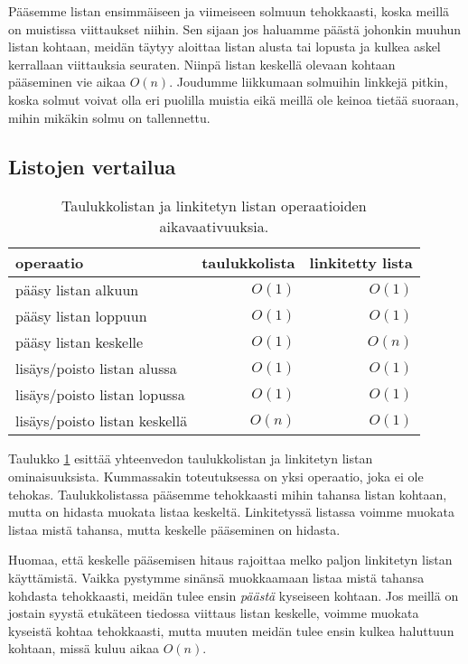 Pääsemme listan ensimmäiseen ja viimeiseen solmuun tehokkaasti,
koska meillä on muistissa viittaukset niihin.
Sen sijaan jos haluamme päästä johonkin muuhun listan kohtaan,
meidän täytyy aloittaa listan alusta tai lopusta ja kulkea askel
kerrallaan viittauksia seuraten.
Niinpä listan keskellä olevaan kohtaan pääseminen vie aikaa $O(n)$.
Joudumme liikkumaan solmuihin linkkejä pitkin, koska solmut voivat
olla eri puolilla muistia eikä meillä ole keinoa tietää suoraan,
mihin mikäkin solmu on tallennettu.

\subsection{Listojen vertailua}

\begin{table}
\center
\begin{tabular}{lrr}
operaatio & taulukkolista & linkitetty lista \\
\hline
pääsy listan alkuun & $O(1)$ & $O(1)$ \\
pääsy listan loppuun & $O(1)$ & $O(1)$ \\ 
pääsy listan keskelle &  $O(1)$ & $O(n)$ \\
lisäys/poisto listan alussa & $O(1)$ & $O(1)$ \\
lisäys/poisto listan lopussa & $O(1)$ & $O(1)$ \\ 
lisäys/poisto listan keskellä &  $O(n)$ & $O(1)$ \\
\end{tabular}
\caption{Taulukkolistan ja linkitetyn listan operaatioiden
aikavaativuuksia.}
\label{tab:taulin}
\end{table}

Taulukko \ref{tab:taulin} esittää yhteenvedon taulukkolistan ja
linkitetyn listan ominaisuuksista.
Kummassakin toteutuksessa on yksi operaatio,
joka ei ole tehokas.
Taulukkolistassa pääsemme tehokkaasti mihin tahansa listan
kohtaan, mutta on hidasta muokata listaa keskeltä.
Linkitetyssä listassa voimme muokata listaa mistä tahansa,
mutta keskelle pääseminen on hidasta.

Huomaa, että keskelle pääsemisen hitaus rajoittaa melko paljon
linkitetyn listan käyttämistä.
Vaikka pystymme sinänsä muokkaamaan listaa mistä tahansa kohdasta
tehokkaasti, meidän tulee ensin \emph{päästä} kyseiseen kohtaan.
Jos meillä on jostain syystä etukäteen tiedossa viittaus listan keskelle,
voimme muokata kyseistä kohtaa tehokkaasti,
mutta muuten meidän tulee ensin kulkea haluttuun kohtaan,
missä kuluu aikaa $O(n)$.

